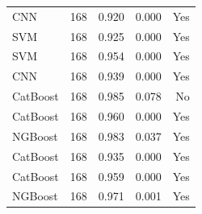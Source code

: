 \begin{table}
\begin{tabular}{lrrrr}
       CNN & 168 &        0.920 &     0.000 &                Yes \\
       SVM & 168 &        0.925 &     0.000 &                Yes \\
       SVM & 168 &        0.954 &     0.000 &                Yes \\
       CNN & 168 &        0.939 &     0.000 &                Yes \\
  CatBoost & 168 &        0.985 &     0.078 &                 No \\
  CatBoost & 168 &        0.960 &     0.000 &                Yes \\
   NGBoost & 168 &        0.983 &     0.037 &                Yes \\
  CatBoost & 168 &        0.935 &     0.000 &                Yes \\
  CatBoost & 168 &        0.959 &     0.000 &                Yes \\
   NGBoost & 168 &        0.971 &     0.001 &                Yes \\
\bottomrule
\end{tabular}
\end{table}
